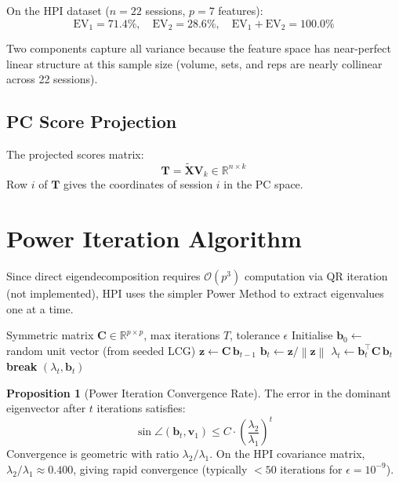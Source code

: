 \documentclass[12pt,a4paper]{report}
\newcommand{\R}{\mathbb{R}}
\newcommand{\norm}[1]{\left\|#1\right\|}
\newcommand{\mat}[1]{\mathbf{#1}}
\newcommand{\vect}[1]{\bm{#1}}
\theoremstyle{definition}
\newtheorem{proposition}{Proposition}[chapter]
\begin{document}
On the HPI dataset ($n = 22$ sessions, $p = 7$ features):
\[
  \text{EV}_1 = 71.4\%, \quad \text{EV}_2 = 28.6\%, \quad
  \text{EV}_1 + \text{EV}_2 = 100.0\%
\]

Two components capture all variance because the feature space has near-perfect
linear structure at this sample size (volume, sets, and reps are nearly collinear
across 22 sessions).

\subsection{PC Score Projection}

The projected scores matrix:
\[
  \mat{T} = \tilde{\mat{X}}\mat{V}_k \in \R^{n \times k}
\]
Row $i$ of $\mat{T}$ gives the coordinates of session $i$ in the PC space.

\section{Power Iteration Algorithm}

Since direct eigendecomposition requires $\mathcal{O}(p^3)$ computation via
QR iteration (not implemented), HPI uses the simpler Power Method to
extract eigenvalues one at a time.

\begin{algorithm}[H]
\caption{Power Iteration for Dominant Eigenpair}
\begin{algorithmic}[1]
\Require Symmetric matrix $\mat{C} \in \R^{p \times p}$, max iterations $T$, tolerance $\epsilon$
\State Initialise $\vect{b}_0 \gets$ random unit vector (from seeded LCG)
  \State $\vect{z} \gets \mat{C}\,\vect{b}_{t-1}$ 
  \State $\vect{b}_t \gets \vect{z} / \norm{\vect{z}}$ 
  \State $\lambda_t \gets \vect{b}_t^\top \mat{C}\,\vect{b}_t$ 
   \textbf{break} \EndIf
\EndFor
\State \Return $(\lambda_t, \vect{b}_t)$
\end{algorithmic}
\end{algorithm}

\begin{proposition}[Power Iteration Convergence Rate]
The error in the dominant eigenvector after $t$ iterations satisfies:
\[
  \sin\angle(\vect{b}_t, \vect{v}_1) \leq C \cdot \left(\frac{\lambda_2}{\lambda_1}\right)^t
\]
Convergence is geometric with ratio $\lambda_2 / \lambda_1$. On the HPI
covariance matrix, $\lambda_2/\lambda_1 \approx 0.400$, giving rapid convergence
(typically $< 50$ iterations for $\epsilon = 10^{-9}$).
\end{proposition}
\end{document}
